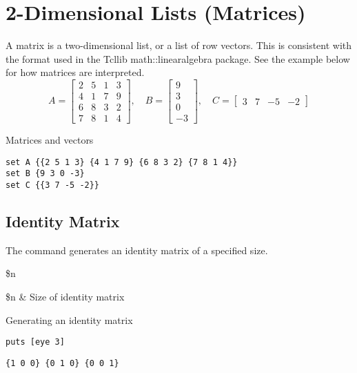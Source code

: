 \documentclass{article}
\begin{document}
\section{2-Dimensional Lists (Matrices)}
A matrix is a two-dimensional list, or a list of row vectors.
This is consistent with the format used in the Tcllib math::linearalgebra package.
See the example below for how matrices are interpreted.
\begin{equation*}\label{eq:matrix_AB}
A=\begin{bmatrix}
2 & 5 & 1 & 3 \\
4 & 1 & 7 & 9 \\
6 & 8 & 3 & 2 \\
7 & 8 & 1 & 4
\end{bmatrix},\quad
B=\begin{bmatrix}
9 \\ 3 \\ 0 \\ -3
\end{bmatrix},\quad
C = \begin{bmatrix}
3 & 7 & -5 & -2
\end{bmatrix}
\end{equation*}
\begin{example}{Matrices and vectors}
\begin{lstlisting}
set A {{2 5 1 3} {4 1 7 9} {6 8 3 2} {7 8 1 4}}
set B {9 3 0 -3}
set C {{3 7 -5 -2}}
\end{lstlisting}
\end{example}
\subsection{Identity Matrix}
The command  generates an identity matrix of a specified size.
\begin{syntax}
 \$n
\end{syntax}
\begin{args}
\$n  & Size of identity matrix 
\end{args}
\begin{example}{Generating an identity matrix}
\begin{lstlisting}
puts [eye 3]
\end{lstlisting}
\tcblower
\begin{lstlisting}
{1 0 0} {0 1 0} {0 0 1}
\end{lstlisting}
\end{example}
\clearpage
\end{document}
